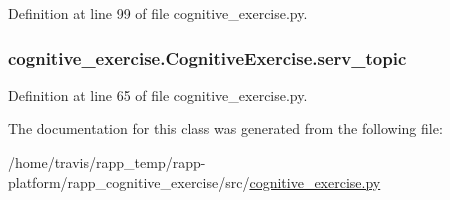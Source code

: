 Definition at line 99 of file cognitive\-\_\-exercise.\-py.

\hypertarget{classcognitive__exercise_1_1CognitiveExercise_a01c12d3ff9258c812e34f89a516699ed}{
\subsubsection[{serv\-\_\-topic}]{\setlength{\rightskip}{0pt plus 5cm}cognitive\-\_\-exercise.\-Cognitive\-Exercise.\-serv\-\_\-topic}}\label{classcognitive__exercise_1_1CognitiveExercise_a01c12d3ff9258c812e34f89a516699ed}


Definition at line 65 of file cognitive\-\_\-exercise.\-py.



The documentation for this class was generated from the following file\-:\begin{DoxyCompactItemize}
\item 
/home/travis/rapp\-\_\-temp/rapp-\/platform/rapp\-\_\-cognitive\-\_\-exercise/src/\hyperlink{cognitive__exercise_8py}{cognitive\-\_\-exercise.\-py}\end{DoxyCompactItemize}
